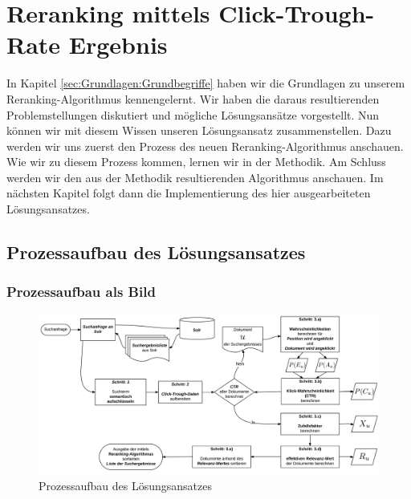 %
\chapter{Reranking mittels Click-Trough-Rate Ergebnis}
\label{sec:Reranking}

In Kapitel \ref{sec:Grundlagen:Grundbegriffe} haben wir die Grundlagen zu unserem Reranking-Algorithmus kennengelernt. Wir haben die daraus resultierenden Problemstellungen diskutiert und mögliche Lösungsansätze vorgestellt. Nun können wir mit diesem Wissen unseren Lösungsansatz zusammenstellen. Dazu werden wir uns zuerst den Prozess des neuen Reranking-Algorithmus anschauen. Wie wir zu diesem Prozess kommen, lernen wir in der Methodik. Am Schluss werden wir den aus der Methodik resultierenden Algorithmus anschauen. Im nächsten Kapitel folgt dann die Implementierung des hier ausgearbeiteten Lösungsansatzes.


\section{Prozessaufbau des Lösungsansatzes}
\label{sec:Reranking:Prozessaufbau}

\subsection{Prozessaufbau als Bild}
\label{sec:Reranking:Prozessaufbau:ProzessaufbauBild}

\begin{figure}[H]
\centering
\vspace{-1em}
\caption[Prozessaufbau des Lösungsansatzes]{Prozessaufbau des Lösungsansatzes}
\label{fig:Prozessaufbau}
\includegraphics[width=\linewidth]{gfx/ProzessaufbauBild}
\vspace{-2em}
\end{figure}
		
